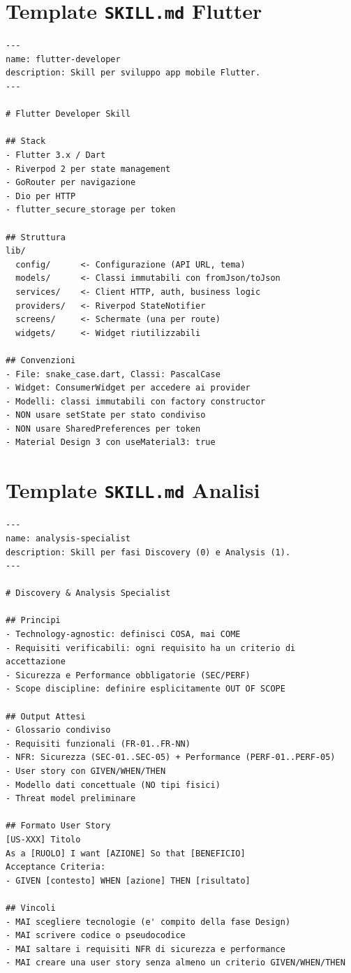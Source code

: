 \section{Template \texttt{SKILL.md} Flutter}

\begin{lstlisting}[language={},title={SKILL.md --- Flutter Developer}]
---
name: flutter-developer
description: Skill per sviluppo app mobile Flutter.
---

# Flutter Developer Skill

## Stack
- Flutter 3.x / Dart
- Riverpod 2 per state management
- GoRouter per navigazione
- Dio per HTTP
- flutter_secure_storage per token

## Struttura
lib/
  config/      <- Configurazione (API URL, tema)
  models/      <- Classi immutabili con fromJson/toJson
  services/    <- Client HTTP, auth, business logic
  providers/   <- Riverpod StateNotifier
  screens/     <- Schermate (una per route)
  widgets/     <- Widget riutilizzabili

## Convenzioni
- File: snake_case.dart, Classi: PascalCase
- Widget: ConsumerWidget per accedere ai provider
- Modelli: classi immutabili con factory constructor
- NON usare setState per stato condiviso
- NON usare SharedPreferences per token
- Material Design 3 con useMaterial3: true
\end{lstlisting}

\section{Template \texttt{SKILL.md} Analisi}

\begin{lstlisting}[language={},title={SKILL.md --- Discovery \& Analysis Specialist}]
---
name: analysis-specialist
description: Skill per fasi Discovery (0) e Analysis (1).
---

# Discovery & Analysis Specialist

## Principi
- Technology-agnostic: definisci COSA, mai COME
- Requisiti verificabili: ogni requisito ha un criterio di accettazione
- Sicurezza e Performance obbligatorie (SEC/PERF)
- Scope discipline: definire esplicitamente OUT OF SCOPE

## Output Attesi
- Glossario condiviso
- Requisiti funzionali (FR-01..FR-NN)
- NFR: Sicurezza (SEC-01..SEC-05) + Performance (PERF-01..PERF-05)
- User story con GIVEN/WHEN/THEN
- Modello dati concettuale (NO tipi fisici)
- Threat model preliminare

## Formato User Story
[US-XXX] Titolo
As a [RUOLO] I want [AZIONE] So that [BENEFICIO]
Acceptance Criteria:
- GIVEN [contesto] WHEN [azione] THEN [risultato]

## Vincoli
- MAI scegliere tecnologie (e' compito della fase Design)
- MAI scrivere codice o pseudocodice
- MAI saltare i requisiti NFR di sicurezza e performance
- MAI creare una user story senza almeno un criterio GIVEN/WHEN/THEN
\end{lstlisting}

